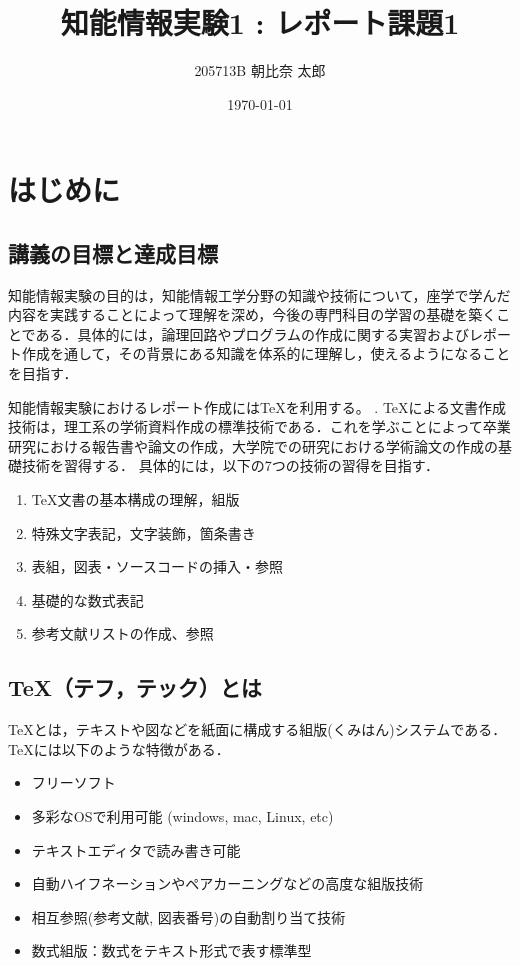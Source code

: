 \documentclass[a4paper, 11pt, titlepage]{jsarticle}
\title {知能情報実験1 : レポート課題1}
\author{205713B  朝比奈 太郎}
\date{\today }
\begin{document}
\maketitle
\tableofcontents
\clearpage

\section{はじめに}
\subsection{講義の目標と達成目標}

知能情報実験の目的は，知能情報工学分野の知識や技術について，座学で学んだ内容を実践することによって理解を深め，今後の専門科目の学習の基礎を築くことである．具体的には，論理回路やプログラムの作成に関する実習およびレポート作成を通して，その背景にある知識を体系的に理解し，使えるようになることを目指す．

知能情報実験におけるレポート作成には\TeX を利用する。
\cite{okumura,texwiki,texshop,mactex,texcom}. \TeX による文書作成技術は，理工系の学術資料作成の標準技術である．これを学ぶことによって卒業研究における報告書や論文の作成，大学院での研究における学術論文の作成の基礎技術を習得する．
具体的には，以下の7つの技術の習得を目指す．

\begin{enumerate}
\item \TeX 文書の基本構成の理解，組版
\item 特殊文字表記，文字装飾，箇条書き
\item 表組，図表・ソースコードの挿入・参照
\item 基礎的な数式表記
\item 参考文献リストの作成、参照
\end{enumerate}

\subsection{\TeX （テフ，テック）とは}
\TeX とは，テキストや図などを紙面に構成する組版(くみはん)システムである．\TeX には以下のような特徴がある．

\begin{itemize}
\item フリーソフト
\item 多彩なOSで利用可能 (windows, mac, Linux, etc)
\item テキストエディタで読み書き可能
\item 自動ハイフネーションやペアカーニングなどの高度な組版技術
\item 相互参照(参考文献, 図表番号)の自動割り当て技術
\item 数式組版：数式をテキスト形式で表す標準型
\end{itemize}
\end{document}
